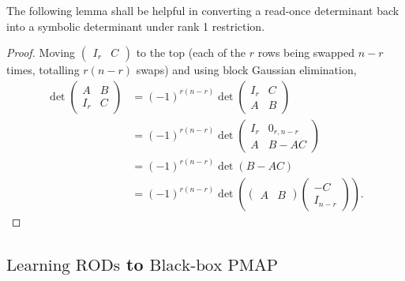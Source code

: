\documentclass[11pt,letterpaper]{article}
\newcommand{\F}{\mathbb{F}}
\newtheorem{lemma}{Lemma}[section]
\newcommand{\probA}{\text{Learning RODs}}
\newcommand{\probB}{\text{Black-box PMAP}}
\begin{document}
{{{The following lemma shall be helpful in converting a read-once determinant back into a symbolic determinant under rank 1 restriction.

\begin{proof}
    Moving $\begin{pmatrix}I_r & C\end{pmatrix}$ to the top (each of the $r$ rows being swapped $n-r$ times, totalling $r(n-r)$ swaps) and using block Gaussian elimination,
    \begin{align*}
        \det\begin{pmatrix}A & B \\ I_r & C\end{pmatrix} &= (-1)^{r(n-r)}\det\begin{pmatrix}I_r & C \\ A & B\end{pmatrix} \\
            &= (-1)^{r(n-r)}\det\begin{pmatrix}I_r & 0_{r,n-r} \\ A & B - AC\end{pmatrix} \\
            &= (-1)^{r(n-r)}\det(B - AC) \\
            &= (-1)^{r(n-r)}\det\left(\begin{pmatrix} A & B \end{pmatrix} \begin{pmatrix} -C \\ I_{n-r} \end{pmatrix}\right)\text{.}
    \end{align*}
\end{proof}

\subsection{$\probA$ to $\probB$}

}}}
\end{document}
